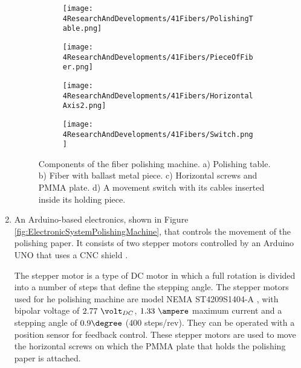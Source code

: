 \begin{enumerate}
\begin{figure}
\centering
    \begin{subfigure}[b]{0.55\textwidth}
    \centering
    \texttt{[image: 4ResearchAndDevelopments/41Fibers/PolishingTable.png]}  
    \caption{\label{subfig:PolishingTable}}
    \end{subfigure}
    \hfill
    \begin{subfigure}[b]{0.3\textwidth}
    \centering
    \texttt{[image: 4ResearchAndDevelopments/41Fibers/PieceOfFiber.png]}  
    \caption{\label{subfig:FiberMetailcPiece}}
    \end{subfigure}
    \hfill
    \begin{subfigure}[b]{0.55\textwidth}
    \centering
    \texttt{[image: 4ResearchAndDevelopments/41Fibers/HorizontalAxis2.png]}  
    \caption{\label{subfig:HorizontalAxis}}
    \end{subfigure}
    \hfill
    \begin{subfigure}[b]{0.4\textwidth}
    \centering
    \texttt{[image: 4ResearchAndDevelopments/41Fibers/Switch.png]}  
    \caption{\label{subfig:3DSwitchPiece}}
    \end{subfigure}
 \caption{Components of the fiber polishing machine. a) Polishing table. b) Fiber with ballast metal piece. c) Horizontal screws and PMMA plate. d) A movement switch with its cables inserted inside its holding piece.}
 \label{fig:PolishingTable}
\end{figure}

\item{} An Arduino-based electronics, shown in Figure \ref{fig:ElectronicSystemPolishingMachine}, that controls the movement of the polishing paper. It consists of two stepper motors controlled by an Arduino UNO \cite{ArduinoUNO} that uses a CNC shield \cite{CNCShield}.


The stepper motor is a type of DC motor in which a full rotation is divided into a number of steps that define the stepping angle. The stepper motors used for he polishing machine are model NEMA ST4209S1404-A \cite{StepperMotors}, with bipolar voltage of $2.77~\volt_{DC}$, $1.33~\ampere$ maximum current and a stepping angle of $0.9\degree$ ($400$ steps/rev). They can be operated with a position sensor for feedback control. These stepper motors are used to move the horizontal screws on which the PMMA plate that holds the polishing paper is attached.


\end{enumerate}
